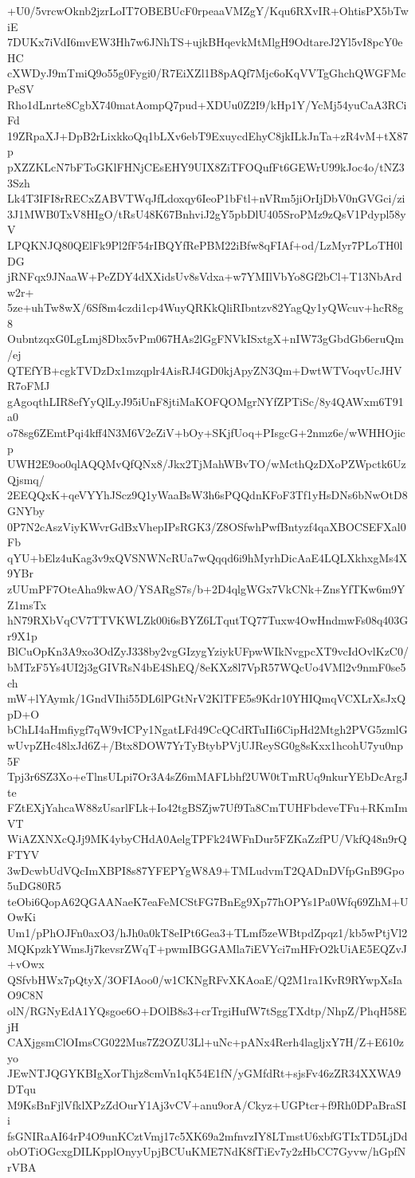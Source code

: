 +U0/5vrcwOknb2jzrLoIT7OBEBUcF0rpeaaVMZgY/Kqu6RXvIR+OhtisPX5bTwiE
7DUKx7iVdI6mvEW3Hh7w6JNhTS+ujkBHqevkMtMlgH9OdtareJ2Yl5vI8pcY0eHC
cXWDyJ9mTmiQ9o55g0Fygi0/R7EiXZl1B8pAQf7Mjc6oKqVVTgGhchQWGFMcPeSV
Rho1dLnrte8CgbX740matAompQ7pud+XDUu0Z2I9/kHp1Y/YcMj54yuCaA3RCiFd
19ZRpaXJ+DpB2rLixkkoQq1bLXv6ebT9ExuycdEhyC8jkILkJnTa+zR4vM+tX87p
pXZZKLcN7bFToGKlFHNjCEsEHY9UIX8ZiTFOQufFt6GEWrU99kJoc4o/tNZ33Szh
Lk4T3IFI8rRECxZABVTWqJfLdoxqy6IeoP1bFtl+nVRm5jiOrIjDbV0nGVGci/zi
3J1MWB0TxV8HIgO/tRsU48K67BnhviJ2gY5pbDlU405SroPMz9zQsV1Pdypl58yV
LPQKNJQ80QElFk9Pl2fF54rIBQYfRePBM22iBfw8qFIAf+od/LzMyr7PLoTH0lDG
jRNFqx9JNaaW+PeZDY4dXXidsUv8sVdxa+w7YMIlVbYo8Gf2bCl+T13NbArdw2r+
5ze+uhTw8wX/6Sf8m4czdi1cp4WuyQRKkQliRIbntzv82YagQy1yQWcuv+hcR8g8
OubntzqxG0LgLmj8Dbx5vPm067HAs2lGgFNVkISxtgX+nIW73gGbdGb6eruQm/ej
QTEfYB+cgkTVDzDx1mzqplr4AisRJ4GD0kjApyZN3Qm+DwtWTVoqvUcJHVR7oFMJ
gAgoqthLIR8efYyQlLyJ95iUnF8jtiMaKOFQOMgrNYfZPTiSc/8y4QAWxm6T91a0
o78sg6ZEmtPqi4kff4N3M6V2eZiV+bOy+SKjfUoq+PIsgcG+2nmz6e/wWHHOjicp
UWH2E9oo0qlAQQMvQfQNx8/Jkx2TjMahWBvTO/wMcthQzDXoPZWpctk6UzQjsmq/
2EEQQxK+qeVYYhJScz9Q1yWaaBsW3h6sPQQdnKFoF3Tf1yHsDNs6bNwOtD8GNYby
0P7N2cAszViyKWvrGdBxVhepIPsRGK3/Z8OSfwhPwfBntyzf4qaXBOCSEFXal0Fb
qYU+bElz4uKag3v9xQVSNWNcRUa7wQqqd6i9hMyrhDicAaE4LQLXkhxgMs4X9YBr
zUUmPF7OteAha9kwAO/YSARgS7s/b+2D4qlgWGx7VkCNk+ZnsYfTKw6m9YZ1msTx
hN79RXbVqCV7TTVKWLZk00i6sBYZ6LTqutTQ77Tuxw4OwHndmwFs08q403Gr9X1p
BlCuOpKn3A9xo3OdZyJ338by2vgGIzygYziykUFpwWIkNvgpcXT9vcIdOvlKzC0/
bMTzF5Ys4UI2j3gGIVRsN4bE4ShEQ/8eKXz8l7VpR57WQcUo4VMl2v9nmF0se5ch
mW+lYAymk/1GndVIhi55DL6lPGtNrV2KlTFE5s9Kdr10YHIQmqVCXLrXsJxQpD+O
bChLI4aHmfiygf7qW9vICPy1NgatLFd49CcQCdRTuIIi6CipHd2Mtgh2PVG5zmlG
wUvpZHc48lxJd6Z+/Btx8DOW7YrTyBtybPVjUJReySG0g8sKxx1hcohU7yu0np5F
Tpj3r6SZ3Xo+eTlnsULpi7Or3A4sZ6mMAFLbhf2UW0tTmRUq9nkurYEbDcArgJte
FZtEXjYahcaW88zUsarlFLk+Io42tgBSZjw7Uf9Ta8CmTUHFbdeveTFu+RKmImVT
WiAZXNXcQJj9MK4ybyCHdA0AelgTPFk24WFnDur5FZKaZzfPU/VkfQ48n9rQFTYV
3wDcwbUdVQcImXBPI8s87YFEPYgW8A9+TMLudvmT2QADnDVfpGnB9Gpo5uDG80R5
teObi6QopA62QGAANaeK7eaFeMCStFG7BnEg9Xp77hOPYs1Pa0Wfq69ZhM+UOwKi
Um1/pPhOJFn0axO3/hJh0a0kT8eIPt6Gea3+TLmf5zeWBtpdZpqz1/kb5wPtjVl2
MQKpzkYWmsJj7kevsrZWqT+pwmIBGGAMla7iEVYci7mHFrO2kUiAE5EQZvJ+vOwx
QSfvbHWx7pQtyX/3OFIAoo0/w1CKNgRFvXKAoaE/Q2M1ra1KvR9RYwpXsIaO9C8N
olN/RGNyEdA1YQsgoe6O+DOlB8s3+crTrgiHufW7tSggTXdtp/NhpZ/PhqH58EjH
CAXjgsmClOImsCG022Mus7Z2OZU3Ll+uNc+pANx4Rerh4lagljxY7H/Z+E610zyo
JEwNTJQGYKBIgXorThjz8cmVn1qK54E1fN/yGMfdRt+sjsFv46zZR34XXWA9DTqu
M9KsBnFjlVfklXPzZdOurY1Aj3vCV+anu9orA/Ckyz+UGPtcr+f9Rh0DPaBraSIi
fsGNIRaAI64rP4O9unKCztVmj17c5XK69a2mfnvzIY8LTmstU6xbfGTIxTD5LjDd
obOTiOGcxgDILKpplOnyyUpjBCUuKME7NdK8fTiEv7y2zHbCC7Gyvw/hGpfNrVBA
